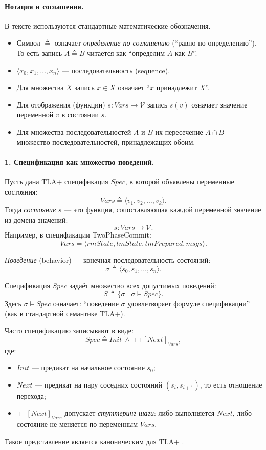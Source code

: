 \paragraph{Нотация и соглашения.}
В тексте используются стандартные математические обозначения.
\begin{itemize}
    \item Символ $\triangleq$ означает \emph{определение по соглашению}
    (``равно по определению''). То есть запись $A \triangleq B$ читается как
    ``определим $A$ как $B$''.
    \item $\langle x_0, x_1, \dots, x_n \rangle$ --- последовательность (sequence).
    \item Для множества $X$ запись $x \in X$ означает ``$x$ принадлежит $X$''.
    \item Для отображения (функции) $s : Vars \to \mathcal{V}$
    запись $s(v)$ означает значение переменной $v$ в состоянии $s$.
    \item Для множества последовательностей $A$ и $B$ их пересечение
    $A \cap B$ — множество последовательностей, принадлежащих обоим.
\end{itemize}

\paragraph{1. Спецификация как множество поведений.}
Пусть дана TLA+ спецификация $\mathit{Spec}$, в которой объявлены переменные
состояния:
\[
Vars \triangleq \langle v_1, v_2, \dots, v_k \rangle.
\]
Тогда \emph{состояние} $s$ — это функция, сопоставляющая каждой переменной
значение из домена значений:
\[
s : Vars \to \mathcal{V}.
\]
Например, в спецификации TwoPhaseCommit:
\[
Vars = \langle rmState, tmState, tmPrepared, msgs \rangle.
\]

\emph{Поведение} (behavior) — конечная последовательность состояний:
\[
\sigma \triangleq \langle s_0, s_1, \dots, s_n \rangle.
\]

Спецификация $\mathit{Spec}$ задаёт множество всех допустимых поведений:
\[
S \triangleq \{ \sigma \mid \sigma \models \mathit{Spec} \}.
\]
Здесь $\sigma \models \mathit{Spec}$ означает: ``поведение $\sigma$
удовлетворяет формуле спецификации'' (как в стандартной семантике TLA+).

Часто спецификацию записывают в виде:
\[
\mathit{Spec} \triangleq \mathit{Init} \ \wedge\ \Box[\mathit{Next}]_{Vars},
\]
где:
\begin{itemize}
    \item $\mathit{Init}$ — предикат на начальное состояние $s_0$;
    \item $\mathit{Next}$ — предикат на пару соседних состояний $(s_i, s_{i+1})$,
    то есть отношение перехода;
    \item $\Box[\mathit{Next}]_{Vars}$ допускает \emph{стуттеринг-шаги}:
    либо выполняется $\mathit{Next}$, либо состояние не меняется по переменным $Vars$.
\end{itemize}
Такое представление является каноническим для TLA+ \cite{LamportSpecifyingSystems2002}.

